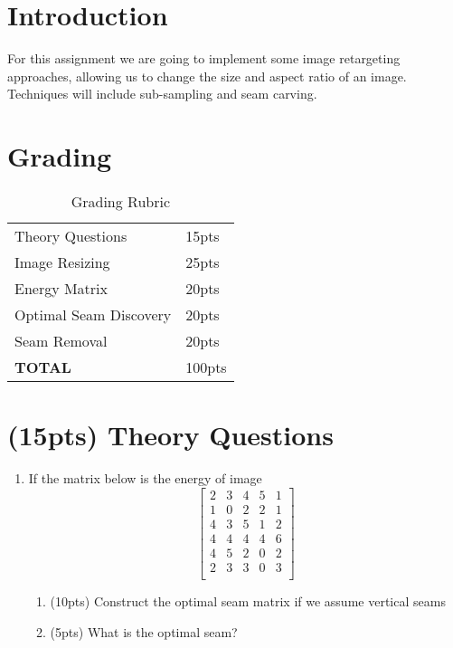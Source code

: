 \documentclass[12pt]{article}
\begin{document}
\maketitle


\section*{Introduction}
For this assignment we are going to implement some image retargeting approaches, allowing us to change the size and aspect ratio of an image.   Techniques will include sub-sampling and seam carving. 



\section*{Grading}
\begin{table}[h]
\begin{centering}
\begin{tabular}{|l|l|}
\hline
Theory Questions & 15pts \\
Image Resizing & 25pts\\
Energy Matrix & 20pts \\
Optimal Seam Discovery & 20pts\\
Seam Removal & 20pts\\
\hline
\textbf{TOTAL} & 100pts\\
\hline
\end{tabular}
\caption{Grading Rubric}
\end{centering}
\end{table}

\newpage
\section{(15pts) Theory Questions}
\begin{enumerate}
\item If the matrix below is the energy of image
$$
\begin{bmatrix}
2&	3&	4&	5&	1\\
1&	0&	2&	2&	1\\
4&	3&	5&	1&	2\\
4&	4&	4&	4&	6\\
4&	5&	2&	0&	2\\
2&	3&	3&	0&	3\\
\end{bmatrix}
$$

\begin{enumerate}
\item(10pts) Construct the optimal seam matrix if we assume vertical seams
\item(5pts) What is the optimal seam?
\end{enumerate}
\end{enumerate}
\end{document}
